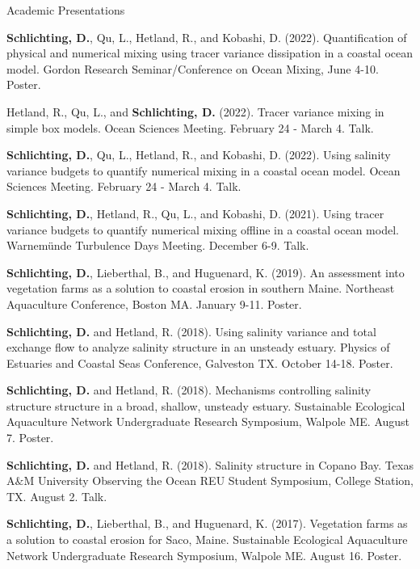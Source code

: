 \documentclass{resume} %
\begin{document}
\begin{rSection}{Academic Presentations} \itemsep -3pt
\begin{etaremune}
    \item \textbf{Schlichting, D.}, Qu, L., Hetland, R., and Kobashi, D. (2022). Quantification of physical and numerical mixing using tracer variance dissipation in a coastal ocean model. Gordon Research Seminar/Conference on Ocean Mixing, June 4-10. Poster.
    \item Hetland, R., Qu, L., and \textbf{Schlichting, D.} (2022). Tracer variance mixing in simple box models. Ocean Sciences Meeting. February 24 - March 4. Talk.
    \item \textbf{Schlichting, D.}, Qu, L., Hetland, R., and Kobashi, D. (2022). Using salinity variance budgets to quantify numerical mixing in a coastal ocean model. Ocean Sciences Meeting. February 24 - March 4. Talk. 
    \item \textbf{Schlichting, D.}, Hetland, R., Qu, L., and Kobashi, D. (2021). Using tracer variance budgets to quantify numerical mixing offline in a coastal ocean model. Warnem\"{u}nde Turbulence Days Meeting. December 6-9. Talk. 
    \item \textbf{Schlichting, D.}, Lieberthal, B., and Huguenard, K. (2019). An assessment into vegetation farms as a solution to coastal erosion in southern Maine. Northeast Aquaculture Conference, Boston MA. January 9-11. Poster.
    \item \textbf{Schlichting, D.} and Hetland, R. (2018). Using salinity variance and total exchange flow to analyze salinity structure in an unsteady estuary. Physics of Estuaries and Coastal Seas Conference, Galveston TX. October 14-18. Poster.
    \item \textbf{Schlichting, D.} and Hetland, R. (2018). Mechanisms controlling salinity structure structure in a broad, shallow, unsteady estuary. Sustainable Ecological Aquaculture Network Undergraduate Research Symposium, Walpole ME. August 7. Poster.
    \item \textbf{Schlichting, D.} and Hetland, R. (2018). Salinity structure in Copano Bay. Texas A$\&$M University Observing the Ocean REU Student Symposium, College Station, TX. August 2. Talk.
    \item \textbf{Schlichting, D.}, Lieberthal, B., and Huguenard, K. (2017). Vegetation farms as a solution to coastal erosion for Saco, Maine. Sustainable Ecological Aquaculture Network Undergraduate Research Symposium, Walpole ME. August 16. Poster.
\end{etaremune}
\end{rSection}
\end{document}
